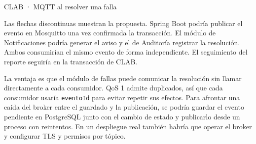 \begin{frame}{CLAB · MQTT al resolver una falla}
{\par
Las flechas discontinuas muestran la propuesta. Spring Boot podría
publicar el evento en Mosquitto una vez confirmada la transacción.
El módulo de Notificaciones podría generar el aviso y el de
Auditoría registrar la resolución. Ambos consumirían el mismo evento
de forma independiente. El seguimiento del reporte seguiría en la
transacción de CLAB.

\par
La ventaja es que el módulo de fallas puede comunicar la resolución
sin llamar directamente a cada consumidor. QoS 1 admite duplicados,
así que cada consumidor usaría \texttt{eventoId} para evitar repetir
sus efectos. Para afrontar una caída del broker entre el guardado
y la publicación, se podría guardar el evento pendiente en PostgreSQL
junto con el cambio de estado y publicarlo desde un proceso con
reintentos. En un despliegue real también habría que operar el broker
y configurar TLS y permisos por tópico.
}
\end{frame}
\endgroup
